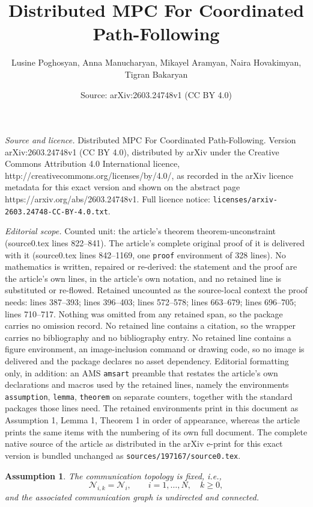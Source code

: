 \documentclass[10pt,a4paper]{amsart}
\title{Distributed MPC For Coordinated Path-Following}
\author{Lusine Poghosyan, Anna Manucharyan, Mikayel Aramyan, Naira Hovakimyan, Tigran Bakaryan}
\date{Source: arXiv:2603.24748v1 (CC BY 4.0)}
\newtheorem{assumption}{Assumption}
\begin{document}
\maketitle

\noindent\emph{Source and licence.} Distributed MPC For Coordinated Path-Following. Version arXiv:2603.24748v1 (CC BY 4.0), distributed by arXiv under the Creative Commons Attribution 4.0 International licence, http://creativecommons.org/licenses/by/4.0/, as recorded in the arXiv licence metadata for this exact version and shown on the abstract page https://arxiv.org/abs/2603.24748v1. Full licence notice: \texttt{licenses/arxiv-2603.24748-CC-BY-4.0.txt}.\par\smallskip

\noindent\textit{Editorial scope.} Counted unit: the article's theorem theorem-unconstraint (source0.tex lines 822--841). The article's complete original proof of it is delivered with it (source0.tex lines 842--1169, one \texttt{proof} environment of 328 lines). No mathematics is written, repaired or re-derived: the statement and the proof are the article's own lines, in the article's own notation, and no retained line is substituted or re-flowed.  Retained uncounted as the source-local context the proof needs: lines 387--393; lines 396--403; lines 572--578; lines 663--679; lines 696--705; lines 710--717.  Nothing was omitted from any retained span, so the package carries no omission record.  No retained line contains a citation, so the wrapper carries no bibliography and no bibliography entry.  No retained line contains a figure environment, an image-inclusion command or drawing code, so no image is delivered and the package declares no asset dependency.  Editorial formatting only, in addition: an AMS \texttt{amsart} preamble that restates the article's own declarations and macros used by the retained lines, namely the environments \texttt{assumption}, \texttt{lemma}, \texttt{theorem} on separate counters, together with the standard packages those lines need.  The retained environments print in this document as Assumption 1, Lemma 1, Theorem 1 in order of appearance, whereas the article prints the same items with the numbering of its own full document.  The complete native source of the article as distributed in the arXiv e-print for this exact version is bundled unchanged as \texttt{sources/197167/source0.tex}.
\begin{assumption}\label{ass:graph}
The communication topology is fixed, i.e.,
\[
\mathcal N_{i,k}=\mathcal N_i,\qquad i=1,\dots,N,\quad k\ge 0,
\]
and the associated communication graph is undirected and connected.
\end{assumption}
\end{document}
